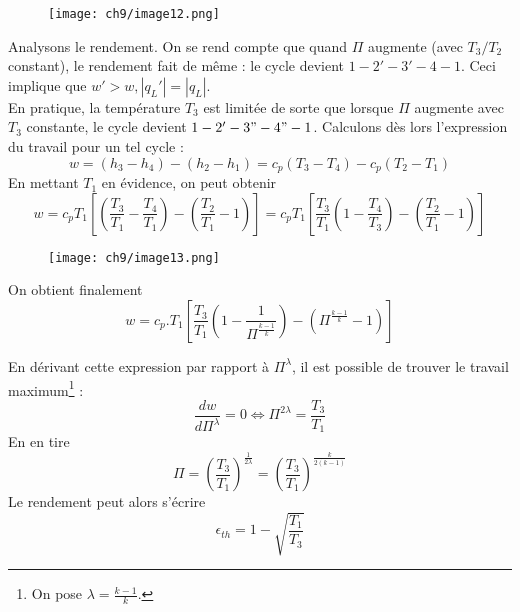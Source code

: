 	\newpage
			\begin{wrapfigure}[12]{l}{4.5cm}
	\texttt{[image: ch9/image12.png]}
		\end{wrapfigure}			
	Analysons le rendement. On se rend compte que quand $\Pi$ augmente (avec $T_3/T_2$ constant), 
	le rendement fait de même : le cycle devient $1-2'-3'-4-1$. Ceci implique que $w'>w, |q_L'|=|q_L|$.\\
	En pratique, la température $T_3$ est limitée de sorte que lorsque $\Pi$ augmente avec 
	$T_3$ constante, le cycle devient $1-2'-3"-4"-1$. Calculons dès lors l'expression du 
	travail pour un tel cycle :
	\begin{equation}
	w = (h_3-h_4)-(h_2-h_1) = c_p(T_3-T_4)-c_p(T_2-T_1)
	\end{equation}
	En mettant $T_1$ en évidence, on peut obtenir
	\begin{equation}
	w = c_pT_1\left[\left(\dfrac{T_3}{T_1}-\dfrac{T_4}{T_1}\right)-\left(\dfrac{T_2}{T_1}-1\right)
	\right] = 
	c_pT_1\left[\dfrac{T_3}{T_1}\left(1-\dfrac{T_4}{T_3}\right)-\left(\dfrac{T_2}{T_1}-1\right)
	\right]
	\end{equation}
					\begin{wrapfigure}[10]{r}{6.5cm}
					\vspace{-5mm}
	\texttt{[image: ch9/image13.png]}
		\end{wrapfigure}
	On obtient finalement
	\begin{equation}
	w = c_p.T_1\left[\dfrac{T_3}{T_1}\left(1-\dfrac{1}{\Pi^{\frac{k-1}{k}}}\right)-\left(
	\Pi^{\frac{k-1}{k}}-1\right)\right]
	\end{equation}

	En dérivant cette expression par rapport à $\Pi^\lambda$, il est possible de trouver le 
	travail maximum\footnote{On pose $\lambda = \frac{k-1}{k}$.} :
	\begin{equation}
	\dfrac{dw}{d\Pi^\lambda} = 0 \Leftrightarrow \Pi^{2\lambda} = \dfrac{T_3}{T_1}
	\end{equation}
	En en tire 
	\begin{equation}
	\Pi = \left(\dfrac{T_3}{T_1}\right)^{\frac{1}{2\lambda}} = \left(\dfrac{T_3}{T_1}\right)^{
	\frac{k}{2(k-1)}}
	\end{equation}
	Le rendement peut alors s'écrire 
	\begin{equation}
	\epsilon_{th} = 1-\sqrt{\dfrac{T_1}{T_3}}
	\end{equation}
	
